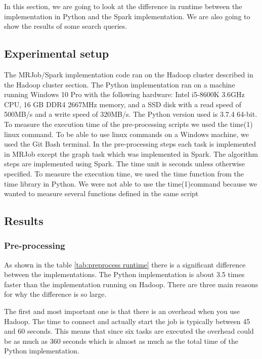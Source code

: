 
In this section, we are going to look at the difference in runtime between the implementation in Python and the Spark implementation. We are also going to show the results of some search queries.

\subsection{Experimental setup}

The MRJob/Spark implementation code ran on the Hadoop cluster described in the Hadoop cluster section. The Python implementation ran on a machine running Windows 10 Pro with the following hardware: Intel i5-8600K 3.6GHz CPU, 16 GB DDR4 2667MHz memory, and a SSD disk with a read speed of 500MB/s and a write speed of 320MB/s. The Python version used is 3.7.4 64-bit. To measure the execution time of the pre-processing scripts we used the time(1)\cite{Time1} linux command. To be able to use linux commands on a Windows machine, we used the Git Bash terminal\cite{GitBash}. In the pre-processing steps each task is implemented in MRJob except the graph task which was implemented in Spark. The algorithm steps are implemented using Spark. The time unit is seconds unless otherwise specified. To measure the execution time, we used the time function from the time library in Python. We were not able to use the time(1)command because we wanted to measure several functions defined in the same script

\subsection{Results}

\subsubsection{Pre-processing}

As shown in the table \ref{tab:preprocess runtime} there is a significant difference between the implementations. The Python implementation is about 3.5 times faster than the implementation running on Hadoop. There are three main reasons for why the difference is so large.
 
The first and most important one is that there is an overhead when you use Hadoop. The time to connect and actually start the job is typically between 45 and 60 seconds. This means that since six tasks are executed the overhead could be as much as 360 seconds which is almost as much as the total time of the Python implementation. 

